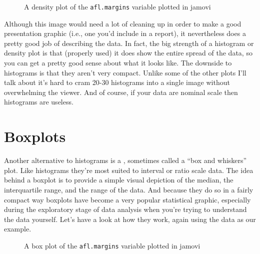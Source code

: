 \begin{figure}[ht]
\begin{center}
\caption{A density plot of the \texttt{afl.margins} variable plotted in jamovi}
\label{fig:histogram2}
\HR
\end{center}
\end{figure}

Although this image would need a lot of cleaning up in order to make a good presentation graphic (i.e., one you'd include in a report), it nevertheless does a pretty good job of describing the data. In fact, the big strength of a histogram or density plot is that (properly used) it does show the entire spread of the data, so you can get a pretty good sense about what it looks like. The downside to histograms is that they aren't very compact. Unlike some of the other plots I'll talk about it's hard to cram 20-30 histograms into a single image without overwhelming the viewer. And of course, if your data are nominal scale then histograms are useless.


\section{Boxplots~\label{sec:boxplots}}

Another alternative to histograms is a , sometimes called a ``box and whiskers'' plot. Like histograms they're most suited to interval or ratio scale data. The idea behind a boxplot is to provide a simple visual depiction of the median, the interquartile range, and the range of the data. And because they do so in a fairly compact way boxplots have become a very popular statistical graphic, especially during the exploratory stage of data analysis when you're trying to understand the data yourself. Let's have a look at how they work, again using the  data as our example.

\begin{figure}[!!htb]
\begin{center}
\caption{A box plot of the \texttt{afl.margins} variable plotted in jamovi}
\label{fig:boxplot1}
\HR
\end{center}
\end{figure}
 
